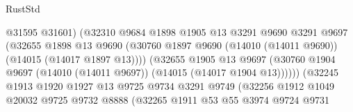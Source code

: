 \begin{lexlean}{RustStd}
\begin{coremodule}
                                          @31595
                                          @31601)
                                        (@32310
                                          @9684
                                          @1898
                                          @1905
                                          @13
                                          @3291
                                          @9690
                                          @3291
                                          @9697
                                          (@32655
                                            @1898
                                            @13
                                            @9690
                                            (@30760
                                              @1897
                                              @9690
                                              (@14010 (@14011 @9690))
                                              (@14015 (@14017 @1897 @13))))
                                          (@32655
                                            @1905
                                            @13
                                            @9697
                                            (@30760
                                              @1904
                                              @9697
                                              (@14010 (@14011 @9697))
                                              (@14015 (@14017 @1904 @13))))))
                                      (@32245
                                        @1913
                                        @1920
                                        @1927
                                        @13
                                        @9725
                                        @9734
                                        @3291
                                        @9749
                                        (@32256
                                          @1912
                                          @1049
                                          @20032
                                          @9725
                                          @9732
                                          @8888
                                          (@32265
                                            @1911
                                            @53
                                            @55
                                            @3974
                                            @9724
                                            @9731

\end{coremodule}
\end{lexlean}
